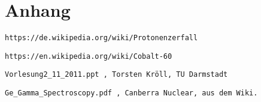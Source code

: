 \documentclass[]{article}
\begin{document}


\newpage
\section{Anhang}


\newpage
\begin{thebibliography}{}

 \begin{verbatim}
https://de.wikipedia.org/wiki/Protonenzerfall
\end{verbatim}

 \begin{verbatim}
https://en.wikipedia.org/wiki/Cobalt-60
\end{verbatim}

\begin{verbatim}
Vorlesung2_11_2011.ppt , Torsten Kröll, TU Darmstadt
\end{verbatim}  

\begin{verbatim}
Ge_Gamma_Spectroscopy.pdf , Canberra Nuclear, aus dem Wiki.
\end{verbatim}  

\end{thebibliography}
\end{document}
